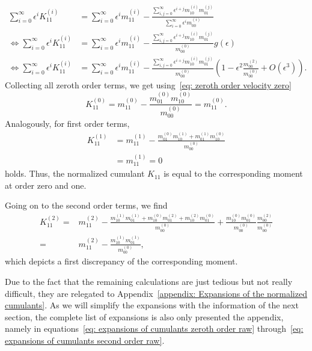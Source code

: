 \begin{equation}
  \begin{aligned}
    \sum_{i=0}^\infty \epsilon^i K_{11}^{(i)}
    & = \sum_{i=0}^\infty \epsilon^i m_{11}^{(i)} -
    \frac{\sum_{i,j=0}^\infty \epsilon^{i+j} m_{10}^{(i)}m_{01}^{(j)}}
        {\sum_{i=0}^\infty \epsilon^i m_{00}^{(i)}} \\
    \Leftrightarrow
    \sum_{i=0}^\infty \epsilon^i K_{11}^{(i)}
    & = \sum_{i=0}^\infty \epsilon^i m_{11}^{(i)} -
    \frac{\sum_{i,j=0}^\infty \epsilon^{i+j} m_{10}^{(i)}m_{01}^{(j)}}
    {m_{00}^{(0)}}
    g(\epsilon)\\
    \Leftrightarrow
  \sum_{i=0}^\infty \epsilon^i K_{11}^{(i)}
   & = \sum_{i=0}^\infty \epsilon^i m_{11}^{(i)} -
  \frac{\sum_{i,j=0}^\infty \epsilon^{i+j} m_{10}^{(i)}m_{01}^{(j)}}
      {m_{00}^{(0)}}
  \left(1 - \epsilon^2 \frac{m_{00}^{(2)}}{m_{00}^{(0)}}  + O(\epsilon^3)\right).
\end{aligned}
\end{equation}
Collecting all zeroth order terms, we get using~\eqref{eq: zeroth order velocity zero}
\begin{equation}
  K_{11}^{(0)} = m_{11}^{(0)} - \frac{m_{01}^{(0)}m_{10}^{(0)}}{m_{00}^{(0)}} =  m_{11}^{(0)}.
\end{equation}
Analogously, for first order terms,
\begin{equation}
  \begin{aligned}
    K_{11}^{(1)} & = m_{11}^{(1)} - \frac{m_{01}^{(0)}m_{10}^{(1)}+m_{01}^{(1)}m_{10}^{(0)}}{m_{00}^{(0)}}
    \\
    &= m_{11}^{(1)} = 0
  \end{aligned}
\end{equation}
holds.
Thus, the normalized cumulant $K_{11}$ is equal to the corresponding moment at order zero and one.

Going on to the second order terms, we find
\begin{equation}
  \begin{aligned}
    K_{11}^{(2)}
    = &m_{11}^{(2)}
    - \frac{
      m_{10}^{(1)}m_{01}^{(1)}
    + m_{10}^{(0)}m_{01}^{(2)}
    + m_{10}^{(2)}m_{01}^{(0)}
    }{m_{00}^{(0)}}
    + \frac{m_{10}^{(0)}m_{01}^{(0)}}{m_{00}^{(0)}}
    \frac{m_{00}^{(2)}}{{m_{00}^{(0)}}}
    \\ = &
    m_{11}^{(2)}
    - \frac{ m_{10}^{(1)}m_{01}^{(1)}}{m_{00}^{(0)}},
  \end{aligned}
\end{equation}
which depicts a first discrepancy of the corresponding moment.

Due to the fact that the remaining calculations are just tedious but not really difficult, they are relegated to Appendix~\ref{appendix: Expansions of the normalized cumulants}.
As we will simplify the expansions with the information of the next section, the complete list of expansions is also only presented the appendix, namely in equations~\eqref{eq: expansions of cumulants zeroth order raw} through~\eqref{eq: expansions of cumulants second order raw}.
